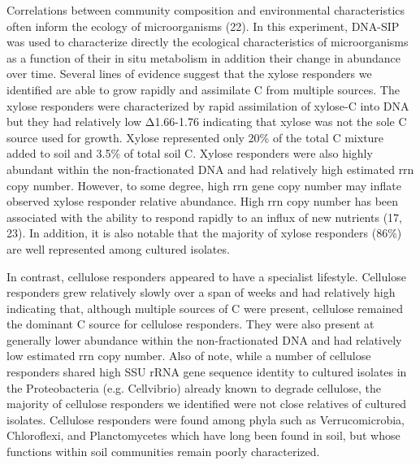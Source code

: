 Correlations between community composition and environmental characteristics
often inform the ecology of microorganisms (22). In this experiment, DNA-SIP
was used to characterize directly the ecological characteristics of
microorganisms as a function of their in situ metabolism in addition their
change in abundance over time. Several lines of evidence suggest that the
xylose responders we identified are able to grow rapidly and assimilate C from
multiple sources. The xylose responders were characterized by rapid
assimilation of xylose-C into DNA but they had relatively low Δ1.66-1.76
indicating that xylose was not the sole C source used for growth. Xylose
represented only 20\% of the total C mixture added to soil and 3.5\% of total
soil C. Xylose responders were also highly abundant within the non-fractionated
DNA and had relatively high estimated rrn copy number. However, to some degree,
high rrn gene copy number may inflate observed xylose responder relative
abundance. High rrn copy number has been associated with the ability to respond
rapidly to an influx of new nutrients (17, 23). In addition, it is also notable
that the majority of xylose responders (86\%) are well represented among
cultured isolates. 

In contrast, cellulose responders appeared to have a specialist
lifestyle. Cellulose responders grew relatively slowly over a span of weeks and
had relatively high indicating that, although multiple sources of
C were present, cellulose remained the dominant C source for cellulose
responders. They were also present at generally lower abundance within the
non-fractionated DNA and had relatively low estimated rrn copy number. Also of
note, while a number of cellulose responders shared high SSU rRNA gene sequence
identity to cultured isolates in the Proteobacteria (e.g. Cellvibrio) already
known to degrade cellulose, the majority of cellulose responders we identified
were not close relatives of cultured isolates. Cellulose responders were found
among phyla such as Verrucomicrobia, Chloroflexi, and Planctomycetes which have
long been found in soil, but whose functions within soil communities remain
poorly characterized.

